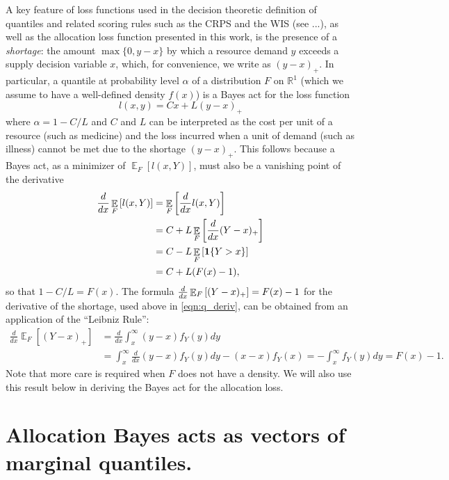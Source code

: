 \documentclass{article}
\DeclareMathOperator{\Ex}{\mathbb{E}}
\begin{document}
A key feature of loss functions used in the decision theoretic definition of quantiles and related scoring rules such as the
CRPS and the WIS (see ...), as well as the allocation loss function presented in this work, is the presence of a \emph{shortage}:
the amount $\max\{0,y-x\}$ by which a resource demand
$y$ exceeds a supply decision variable $x$, which, for convenience, we write as $(y-x)_{+}$. In particular, a quantile at
probability level $\alpha$ of a distribution $F$ on $\mathbb{R}^1$ (which we assume to have a well-defined density $f(x)$)
is a Bayes act for the loss function
\[
l(x,y) = Cx + L(y-x)_{+}
\]
where $\alpha = 1-C/L$ and $C$ and $L$ can be interpreted as the cost per unit of a resource (such as medicine) and the loss
incurred when a unit of demand (such as illness) cannot be met due to the shortage $(y-x)_{+}$.  This follows because a
Bayes act, as a minimizer of $\Ex_F[l(x,Y)]$, must also be a vanishing point of the derivative
\begin{align}
\dby{}{x} \Ex_F\left[l(x,Y)\right] &= \Ex_F\left[\dby{}{x}l(x,Y)\right] \nonumber\\
&= C + L\Ex_F\left[\dby{}{x}(Y-x)_+\right] \nonumber\\
&= C - L\Ex_F\left[\mathbf{1}\{Y > x\}\right] \nonumber\\
&= C + L(F(x) - 1), \label{eqn:q_deriv}
\end{align}
so that $1-C/L = F(x)$.
The formula $\dby{}{x}\Ex_F\left[(Y-x)_+\right] = F(x) - 1$ for the derivative of the shortage,
used above in \eqref{eqn:q_deriv}, can be obtained from an application of the ``Leibniz Rule'':
\begin{align}
	\frac{d}{dx} \Ex_F [(Y-x)_{+}] &= \frac{d}{dx} \int_{x}^{\infty} (y-x) f_Y(y)dy \nonumber\\
	&= \int_{x}^{\infty} \frac{d}{dx}(y-x) f_Y(y)dy - (x-x) f_Y(x) = -\int_{x}^{\infty} f_Y(y)dy = F(x)-1. \label{eqn:shortage_deriv}
\end{align}
Note that more care is required when $F$ does not have a density.
We will also use this result below in deriving the Bayes act for the allocation loss.

\section{Allocation Bayes acts as vectors of marginal quantiles.}
\label{sec:bayes-quantiles}
\end{document}

